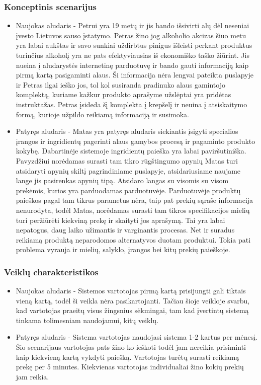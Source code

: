 \documentclass[oneside]{VUMIFPSkursinis}
\begin{document}
		\subsubsection{Konceptinis scenarijus}
			\begin{itemize}
				\item{Naujokas aludaris - Petrui yra 19 metų ir jis bando išsivirti alų dėl neseniai įvesto Lietuvos sauso įstatymo.
					Petras žino jog alkoholio akcizas šiuo metu yra labai aukštas ir savo sunkiai uždirbtus pinigus išleisti perkant produktus turinčius alkoholį yra ne pats efektyviausias iš ekonomiško taško žiūrint.
					Jis nueina į aludarystės internetinę parduotuvę ir bando gauti informaciją kaip pirmą kartą pasigaminti alaus.
					Ši informacija nėra lengvai pateikta puslapyje ir Petras ilgai ieško jos, tol kol susiranda pradinuko alaus gamintojo komplektą, kuriame kažkur produkto aprašyme užslėptai yra pridėtas instruktažas.
					Petras įsideda šį komplekta į krepšelį ir neuina į atsiskaitymo formą, kurioje užpildo reikiamą informaciją ir susimoka.}
				\item{Patyręs aludaris - Matas yra patyręs aludaris siekiantis įsigyti specialios įrangos ir ingridientų pagerinti alaus gamybos procesą ir pagaminto produkto kokybę.
					Dabartinėje sistemoje ingridientų paieška yra labai paviršutiniška.
					Pavyzdžiui norėdamas surasti tam tikro rūgštingumo apynių Matas turi atsidaryti apynių skiltį pagrindiniame puslapyje, atsidariusiame naujame lange jis pasirenkas apynių tipą.
					Atsidaro langas su visomis su visom prekėmis, kurios yra parduodamas parduotuvėje.
					Parduotuvėje produktų paieškos pagal tam tikrus parametus nėra, taip pat prekių sąraše informacija nenurodyta, todėl Matas, norėdamas surasti tam tikros specifikacijos mielių turi peržiūrėti kiekviną prekę ir skaityti jos aprašymą.
					Tai yra labai nepatogus, daug laiko užimantis ir varginantis procesas.
					Net ir suradus reikiamą produktą neparodomos alternatyvos duotam produktui.
					Tokia pati problema vyrauja ir mielių, salyklo, įrangos bei kitų prekių paieškoje. }
			\end{itemize}
		\subsubsection{Veiklų charakteristikos}
				\begin{itemize}
					\item{Naujokas aludaris - Sistemos vartotojas pirmą kartą prisijungti gali tiktais vieną kartą, todėl ši veikla nėra pasikartojanti.
						Tačiau šioje veikloje svarbu, kad vartotojas praeitų visus žingsnius sėkmingai, tam kad įvertintų sistemą tinkama tolimesniam naudojamui, kitų veiklų. }
					\item{Patyręs aludaris - Sistema vartotojas naudojasi sistema 1-2 kartus per mėnesį.
						Šio scenarijaus vartotojas pats žino ko ieškoti todėl jam nereikia prisiminti kaip kiekvieną kartą vykdyti paiešką.
						Vartotojas turėtų surasti reikiamą prekę per 5 minutes.
						Kiekvienas vartotojas individualiai žino kokių prekių jam reikia.}
					
				\end{itemize}
\end{document}
